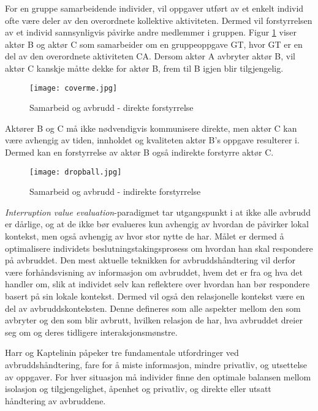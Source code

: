 \noindent
For en gruppe samarbeidende individer, vil oppgaver utført av et enkelt individ ofte være deler av den overordnete kollektive aktiviteten. Dermed vil forstyrrelsen av et individ sannsynligvis påvirke andre medlemmer i gruppen. Figur \ref{direkte} viser aktør B og aktør C som samarbeider om en gruppeoppgave GT, hvor GT er en del av den overordnete aktiviteten CA. Dersom aktør A avbryter aktør B, vil aktør C kanskje måtte dekke for aktør B, frem til B igjen blir tilgjengelig.
\begin{figure}[H]
\centering
\texttt{[image: coverme.jpg]}
\caption{Samarbeid og avbrudd - direkte forstyrrelse}
\label{direkte}
\end{figure}

\noindent
Aktører B og C må ikke nødvendigvis kommunisere direkte, men aktør C kan være avhengig av tiden, innholdet og kvaliteten aktør B's oppgave resulterer i. Dermed kan en forstyrrelse av aktør B også indirekte forstyrre aktør C.
\begin{figure}[H]
\centering
\texttt{[image: dropball.jpg]}
\caption{Samarbeid og avbrudd - indirekte forstyrrelse}
\label{indirekte}
\end{figure}

\noindent
\emph{Interruption value evaluation}-paradigmet tar utgangspunkt i at ikke alle avbrudd er dårlige, og at de ikke bør evalueres kun avhengig av hvordan de påvirker lokal kontekst, men også avhengig av hvor stor nytte de har. Målet er dermed å optimalisere individets beslutningstakingsprosess om hvordan han skal respondere på avbruddet. Den mest aktuelle teknikken for avbruddshåndtering vil derfor være forhåndsvisning av informasjon om avbruddet, hvem det er fra og hva det handler om, slik at individet selv kan reflektere over hvordan han bør respondere basert på sin lokale kontekst. Dermed vil også den relasjonelle kontekst være en del av avbruddskonteksten. Denne defineres som alle aspekter mellom den som avbryter og den som blir avbrutt, hvilken relasjon de har, hva avbruddet dreier seg om og deres tidligere interaksjonsmønstre.

\noindent
Harr og Kaptelinin påpeker tre fundamentale utfordringer ved avbruddshåndtering, fare for å miste informasjon, mindre privatliv, og utsettelse av oppgaver. For hver situasjon må individer finne den optimale balansen mellom isolasjon og tilgjengelighet, åpenhet og privatliv, og direkte eller utsatt håndtering av avbruddene. 

